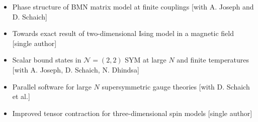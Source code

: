 \renewcommand{\arraystretch}{1.1}

	\begin{itemize}
	 \item Phase structure of BMN matrix model at finite couplings [with A. Joseph and D. Schaich] 
	 \item Towards exact result of two-dimensional Ising model in a magnetic field [single author] 
	 \item Scalar bound states in $\mathcal{N}=(2,2)$ SYM at large $N$ and finite temperatures [with A. Joseph, D. Schaich, N. Dhindsa] 
	 \item Parallel software for large $N$ supersymmetric gauge theories [with D. Schaich et al.] 
	 \item Improved tensor contraction for three-dimensional spin models [single author] 
	  \end{itemize}
